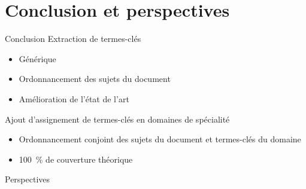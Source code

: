 \section{Conclusion et perspectives}
  \begin{frame}{Conclusion}
    Extraction de termes-clés
    \begin{itemize}
      \item{Générique}
      \item{Ordonnancement des sujets du document}
      \item{Amélioration de l'état de l'art}
    \end{itemize}

    \vspace{1em}

    Ajout d'assignement de termes-clés en domaines de spécialité
    \begin{itemize}
      \item{Ordonnancement conjoint des sujets du document et termes-clés du
            domaine}
      \item{100~\% de couverture théorique}
    \end{itemize}
  \end{frame}

  \begin{frame}{Perspectives}
  \end{frame}

